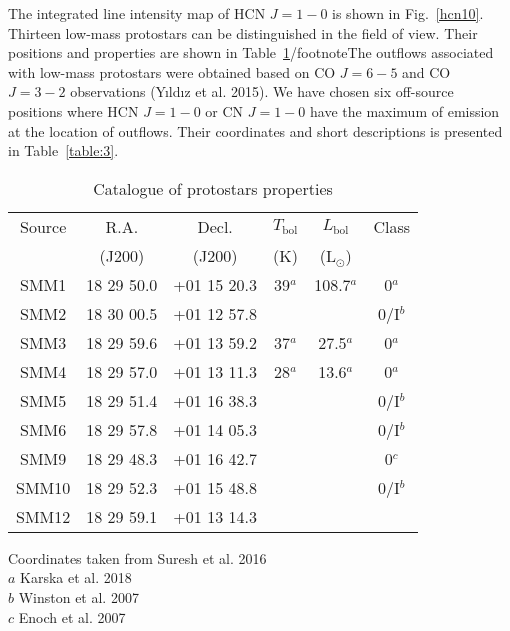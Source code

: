 \documentclass{aa}
\begin{document}
The integrated line intensity map of HCN $J=1-0$ is shown in Fig.~\ref{hcn10}. 
Thirteen low-mass protostars can be distinguished in the field of view. Their positions and properties are shown in Table~\ref{table:2}/footnote{The outflows associated with low-mass protostars were obtained based on CO $J=6-5$ and CO $J=3-2$ observations (Y{\i}ld{\i}z et al. 2015)}. We have chosen six off-source positions where HCN $J=1-0$ or CN $J=1-0$ have the maximum of emission at the location of outflows. Their coordinates and short descriptions is presented in Table~\ref{table:3}.


\begin{table}
\caption{Catalogue of protostars properties}             %
\label{table:2}      %
\centering                          %
\begin{tabular}{c c c c c c} 
\hline\hline 
Source & R.A. & Decl. & $T_\mathrm{bol}$ &  $L_\mathrm{bol}$  & Class\\
 & (J200) & (J200) & (K) & (L$_\odot$) & \\
\hline  
SMM1 & 18 29 50.0 & +01 15 20.3 & 39$^a$ & 108.7$^a$ & 0$^a$\\

SMM2 & 18 30 00.5 & +01 12 57.8 &  &  & 0/I$^b$\\

SMM3 & 18 29 59.6 & +01 13 59.2 & 37$^a$ & 27.5$^a$ & 0$^a$\\

SMM4 & 18 29 57.0 & +01 13 11.3 & 28$^a$ & 13.6$^a$ & 0$^a$\\

SMM5 & 18 29 51.4 & +01 16 38.3 &  &  & 0/I$^b$\\

SMM6 & 18 29 57.8 & +01 14 05.3 &  &  & 0/I$^b$\\

SMM9 & 18 29 48.3 & +01 16 42.7 &  &  & 0$^c$\\

SMM10 & 18 29 52.3 & +01 15 48.8 &  &  & 0/I$^b$\\

SMM12 & 18 29 59.1 & +01 13 14.3 &  &  & \\
\hline
\end{tabular}
\begin{flushleft}
Coordinates taken from Suresh et al. 2016\\
$a$ Karska et al. 2018 \\
$b$ Winston et al. 2007 \\
$c$ Enoch et al. 2007 \\
\end{flushleft}
\end{table}
\end{document}
